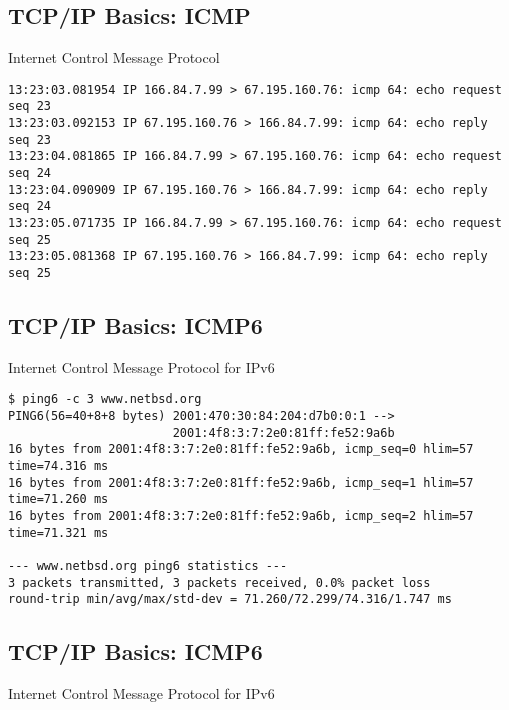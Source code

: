 \documentclass[xga]{xdvislides}
\begin{document}
\subsection{TCP/IP Basics: ICMP}
\begin{center}
Internet Control Message Protocol
\end{center}
\vspace{.2in}

\begin{verbatim}
13:23:03.081954 IP 166.84.7.99 > 67.195.160.76: icmp 64: echo request seq 23
13:23:03.092153 IP 67.195.160.76 > 166.84.7.99: icmp 64: echo reply seq 23
13:23:04.081865 IP 166.84.7.99 > 67.195.160.76: icmp 64: echo request seq 24
13:23:04.090909 IP 67.195.160.76 > 166.84.7.99: icmp 64: echo reply seq 24
13:23:05.071735 IP 166.84.7.99 > 67.195.160.76: icmp 64: echo request seq 25
13:23:05.081368 IP 67.195.160.76 > 166.84.7.99: icmp 64: echo reply seq 25
\end{verbatim}


\subsection{TCP/IP Basics: ICMP6}
\begin{center}
Internet Control Message Protocol for IPv6
\end{center}
\vspace{.2in}

\begin{verbatim}
$ ping6 -c 3 www.netbsd.org
PING6(56=40+8+8 bytes) 2001:470:30:84:204:d7b0:0:1 -->
                       2001:4f8:3:7:2e0:81ff:fe52:9a6b
16 bytes from 2001:4f8:3:7:2e0:81ff:fe52:9a6b, icmp_seq=0 hlim=57 time=74.316 ms
16 bytes from 2001:4f8:3:7:2e0:81ff:fe52:9a6b, icmp_seq=1 hlim=57 time=71.260 ms
16 bytes from 2001:4f8:3:7:2e0:81ff:fe52:9a6b, icmp_seq=2 hlim=57 time=71.321 ms

--- www.netbsd.org ping6 statistics ---
3 packets transmitted, 3 packets received, 0.0% packet loss
round-trip min/avg/max/std-dev = 71.260/72.299/74.316/1.747 ms
\end{verbatim}

\subsection{TCP/IP Basics: ICMP6}
\begin{center}
Internet Control Message Protocol for IPv6
\end{center}
\vspace{.2in}
\end{document}
